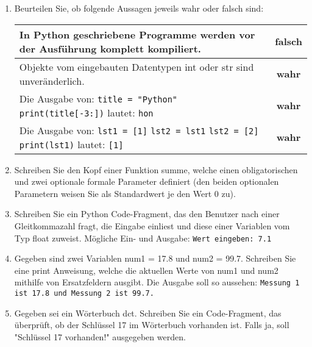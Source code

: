 \documentclass[11pt, oneside]{book}
\begin{document}
\begin{enumerate}[label=(\alph*)]
    \item Beurteilen Sie, ob folgende Aussagen jeweils wahr oder falsch sind:
    
    \begin{tabularx}{\textwidth}{ | X | c | }
    \hline
    In Python geschriebene Programme werden vor der Ausführung komplett kompiliert. & \textbf{falsch} \\
    \hline
    Objekte vom eingebauten Datentypen int oder str sind unveränderlich. & \textbf{wahr} \\
    \hline
    Die Ausgabe von: \newline
    \hspace*{1cm}\texttt{title = "Python"} \newline
    \hspace*{1cm}\texttt{print(title[-3:])} \newline
    lautet: \texttt{hon} & \textbf{wahr} \\
    \hline
    Die Ausgabe von: \newline
    \hspace*{1cm}\texttt{lst1 = [1]} \newline
    \hspace*{1cm}\texttt{lst2 = lst1} \newline
    \hspace*{1cm}\texttt{lst2 = [2]} \newline
    \hspace*{1cm}\texttt{print(lst1)} \newline
    lautet: \texttt{[1]} & \textbf{wahr} \\
    \hline
    \end{tabularx}
    
    \item Schreiben Sie den Kopf einer Funktion summe, welche einen obligatorischen und zwei optionale formale Parameter definiert (den beiden optionalen Parametern weisen Sie als Standardwert je den Wert 0 zu).
    
    \item Schreiben Sie ein Python Code-Fragment, das den Benutzer nach einer Gleitkommazahl fragt, die Eingabe einliest und diese einer Variablen vom Typ float zuweist. Mögliche Ein- und Ausgabe: \newline
    \texttt{Wert eingeben: 7.1}
    
    \item Gegeben sind zwei Variablen num1 = 17.8 und num2 = 99.7. Schreiben Sie eine print Anweisung, welche die aktuellen Werte von num1 und num2 mithilfe von Ersatzfeldern ausgibt. Die Ausgabe soll so aussehen: \newline
    \texttt{Messung 1 ist 17.8 und Messung 2 ist 99.7.}
    
    \item Gegeben sei ein Wörterbuch dct. Schreiben Sie ein Code-Fragment, das überprüft, ob der Schlüssel 17 im Wörterbuch vorhanden ist. Falls ja, soll "Schlüssel 17 vorhanden!" ausgegeben werden.
\end{enumerate}
\end{document}
